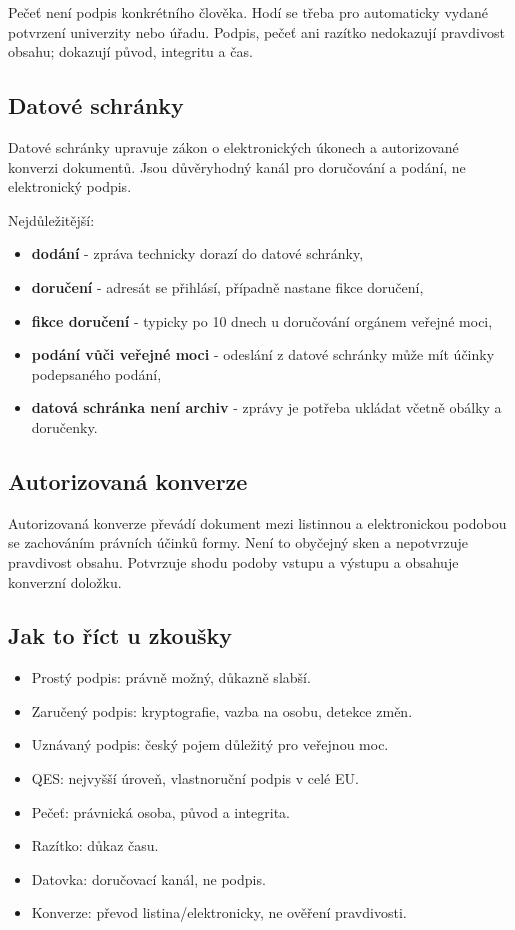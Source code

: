 Pečeť není podpis konkrétního člověka. Hodí se třeba pro automaticky vydané potvrzení univerzity nebo úřadu. Podpis, pečeť ani razítko nedokazují pravdivost obsahu; dokazují původ, integritu a čas.

\subsection*{Datové schránky}
Datové schránky upravuje zákon o elektronických úkonech a autorizované konverzi dokumentů. Jsou důvěryhodný kanál pro doručování a podání, ne elektronický podpis.

Nejdůležitější:
\begin{itemize}
  \item \textbf{dodání} - zpráva technicky dorazí do datové schránky,
  \item \textbf{doručení} - adresát se přihlásí, případně nastane fikce doručení,
  \item \textbf{fikce doručení} - typicky po 10 dnech u doručování orgánem veřejné moci,
  \item \textbf{podání vůči veřejné moci} - odeslání z datové schránky může mít účinky podepsaného podání,
  \item \textbf{datová schránka není archiv} - zprávy je potřeba ukládat včetně obálky a doručenky.
\end{itemize}


\subsection*{Autorizovaná konverze}
Autorizovaná konverze převádí dokument mezi listinnou a elektronickou podobou se zachováním právních účinků formy. Není to obyčejný sken a nepotvrzuje pravdivost obsahu. Potvrzuje shodu podoby vstupu a výstupu a obsahuje konverzní doložku.

\subsection*{Jak to říct u zkoušky}
\begin{itemize}
  \item Prostý podpis: právně možný, důkazně slabší.
  \item Zaručený podpis: kryptografie, vazba na osobu, detekce změn.
  \item Uznávaný podpis: český pojem důležitý pro veřejnou moc.
  \item QES: nejvyšší úroveň, vlastnoruční podpis v celé EU.
  \item Pečeť: právnická osoba, původ a integrita.
  \item Razítko: důkaz času.
  \item Datovka: doručovací kanál, ne podpis.
  \item Konverze: převod listina/elektronicky, ne ověření pravdivosti.
\end{itemize}


